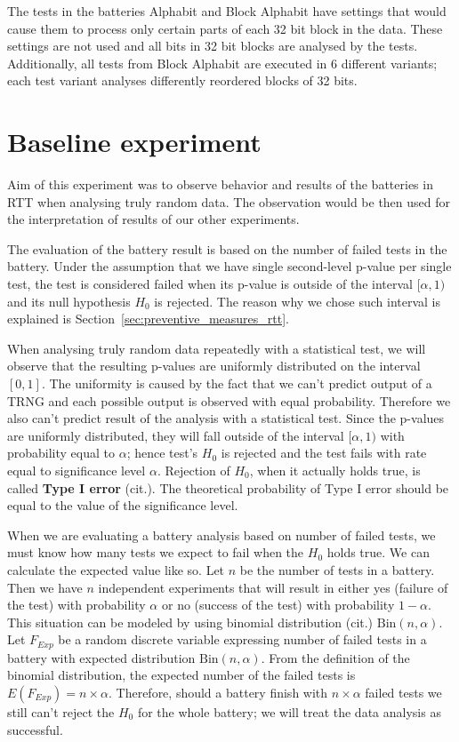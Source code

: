 \documentclass[
  digital,  	%
  color,		%
  oneside,   	%
  12pt,
  nocover,
  notable,
  nolof,
  nolot,
]{fithesis3}
\theoremstyle{definition}
\theoremstyle{remark}
\begin{document}
The tests in the batteries Alphabit and Block Alphabit have settings that would cause them to process only certain parts of each 32 bit block in the data. These settings are not used and all bits in 32 bit blocks are analysed by the tests. Additionally, all tests from Block Alphabit are executed in 6 different variants; each test variant analyses differently reordered blocks of 32 bits.

\section{Baseline experiment}
Aim of this experiment was to observe behavior and results of the batteries in RTT when analysing truly random data. The observation would be then used for the interpretation of results of our other experiments. 

The evaluation of the battery result is based on the number of failed tests in the battery. Under the assumption that we have single second-level p-value per single test, the test is considered failed when its p-value is outside of the interval $[\alpha, 1)$ and its null hypothesis $H_0$ is rejected. The reason why we chose such interval is explained is Section~\ref{sec:preventive_measures_rtt}.

When analysing truly random data repeatedly with a statistical test, we will observe that the resulting p-values are uniformly distributed on the interval $[0,1]$. The uniformity is caused by the fact that we can't predict output of a TRNG and each possible output is observed with equal probability. Therefore we also can't predict result of the analysis with a statistical test. Since the p-values are uniformly distributed, they will fall outside of the interval $[\alpha, 1)$ with probability equal to $\alpha$; hence test's $H_0$ is rejected and the test fails with rate equal to significance level $\alpha$. Rejection of $H_0$, when it actually holds true, is called \textbf{Type I error} (cit.). The theoretical probability of Type I error should be equal to the value of the significance level.

When we are evaluating a battery analysis based on number of failed tests, we must know how many tests we expect to fail when the $H_0$ holds true. We can calculate the expected value like so. Let $n$ be the number of tests in a battery. Then we have $n$ independent experiments that will result in either yes (failure of the test) with probability $\alpha$ or no (success of the test) with probability $1-\alpha$. This situation can be modeled by using binomial distribution (cit.) $\text{Bin}(n, \alpha)$. Let $F_{Exp}$ be a random discrete variable expressing number of failed tests in a battery with expected distribution $\text{Bin}(n, \alpha)$. From the definition of the binomial distribution, the expected number of the failed tests is $E(F_{Exp}) = n \times \alpha$. Therefore, should a battery finish with $n \times \alpha$ failed tests we still can't reject the $H_0$ for the whole battery; we will treat the data analysis as successful.
\end{document}
